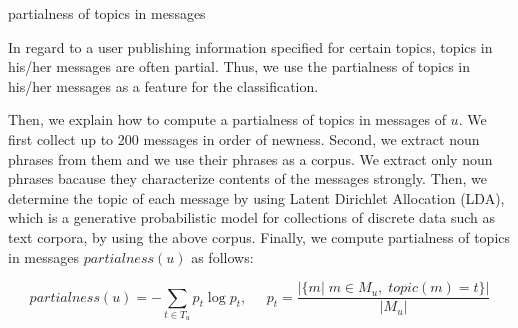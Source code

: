 \begin{description}
\bf {\item[(iv)] partialness of topics in messages}
\end{description}

In regard to a user publishing information specified for certain topics,
topics in his/her messages are often partial.  Thus, we use the
partialness of topics in his/her messages as a feature for the
classification.

Then, we explain how to compute a partialness of topics in messages of
$u$.  We first collect up to 200 messages in order of newness.  Second,
we extract noun phrases from them and we use their phrases as a corpus.
We extract only noun phrases bacause they characterize contents of the
messages strongly.  Then, we determine the topic of each message by
using Latent Dirichlet Allocation (LDA), which is a generative
probabilistic model for collections of discrete data such as text
corpora, by using the above corpus.  Finally, we compute partialness of
topics in messages $\mathit{partialness}(u)$ as follows:

\vspace{-3ex}
\[
 \mathit{partialness}(u) = - \sum_{t \in T_u} p_t \log p_t,\;\;\;\;\;
 p_t = \frac{|\{m|\;m \in M_u,\;\mathit{topic}(m) = t\}|}{|M_u|}
\]
\vspace{-3ex}

